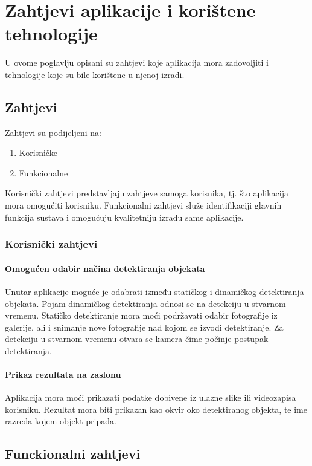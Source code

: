 \chapter{Zahtjevi aplikacije i korištene tehnologije}
U ovome poglavlju opisani su zahtjevi koje aplikacija mora zadovoljiti i tehnologije koje su bile korištene u njenoj izradi. 

\section{Zahtjevi}

Zahtjevi su 
podijeljeni na:
\begin{enumerate}
    \item Korisničke
    \item Funkcionalne
\end{enumerate}

Korisnički zahtjevi predstavljaju zahtjeve samoga korisnika, tj. što aplikacija mora omogućiti korisniku.
Funkcionalni zahtjevi služe identifikaciji glavnih funkcija sustava i omogućuju kvalitetniju izradu same
aplikacije.

\subsection{Korisnički zahtjevi}
\subsubsection{Omogućen odabir načina detektiranja objekata} 
Unutar aplikacije moguće je odabrati između statičkog i dinamičkog detektiranja
objekata. Pojam dinamičkog detektiranja odnosi se na detekciju u stvarnom vremenu. Statičko detektiranje mora moći podržavati odabir fotografije iz galerije, ali i snimanje nove fotografije nad kojom se 
izvodi detektiranje. Za detekciju u stvarnom vremenu otvara se kamera čime počinje postupak detektiranja. 

\subsubsection{Prikaz rezultata na zaslonu}
Aplikacija mora moći prikazati podatke dobivene iz ulazne slike ili videozapisa korisniku. Rezultat mora biti prikazan 
kao okvir oko detektiranog objekta, te ime razreda kojem objekt pripada.

\section{Funckionalni zahtjevi}

